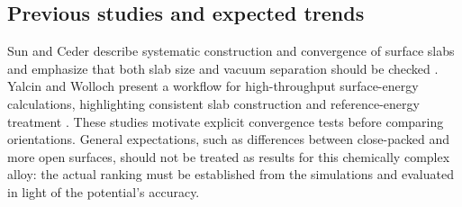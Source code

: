 \subsection{Previous studies and expected trends}
Sun and Ceder describe systematic construction and convergence of surface slabs and emphasize that both slab size and vacuum separation should be checked \cite{sun2013slabs}. Yalcin and Wolloch present a workflow for high-throughput surface-energy calculations, highlighting consistent slab construction and reference-energy treatment \cite{yalcin2024surfflow}. These studies motivate explicit convergence tests before comparing orientations. General expectations, such as differences between close-packed and more open surfaces, should not be treated as results for this chemically complex alloy: the actual ranking must be established from the simulations and evaluated in light of the potential's accuracy.
